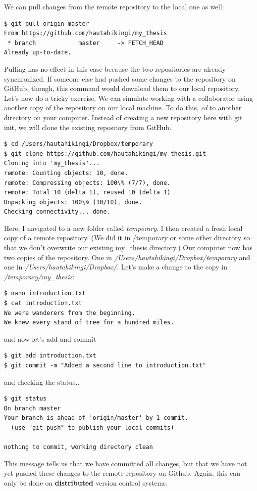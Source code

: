 \documentclass{article}
\begin{document}
We can pull changes from the remote repository to the local one as well:

\begin{lstlisting}[frame=single]
$ git pull origin master
From https://github.com/hautahikingi/my_thesis
 * branch            master     -> FETCH_HEAD
Already up-to-date.
\end{lstlisting}
Pulling has no effect in this case because the two repositories are already synchronized. If someone else had pushed some changes to the repository on GitHub, though, this command would download them to our local repository.\\

Let's now do a tricky exercise. We can simulate working with a collaborator using another copy of the repository on our local machine. To do this, \emph{cd} to another directory on your computer. Instead of creating a new repository here with git init, we will clone the existing repository from GitHub.\\

\begin{lstlisting}
$ cd /Users/hautahikingi/Dropbox/temporary
$ git clone https://github.com/hautahikingi/my_thesis.git
Cloning into 'my_thesis'...
remote: Counting objects: 10, done.
remote: Compressing objects: 100\% (7/7), done.
remote: Total 10 (delta 1), reused 10 (delta 1)
Unpacking objects: 100\% (10/10), done.
Checking connectivity... done.
\end{lstlisting}
Here, I navigated to a new folder called \emph{temporary}. I then created a fresh local copy of a remote repository. (We did it in /temporary or some other directory so that we don't overwrite our existing my\_thesis directory.) Our computer now has two copies of the repository. One in \emph{/Users/hautahikingi/Dropbox/temporary} and one in \emph{/Users/hautahikingi/Dropbox/}. Let's make a change to the copy in \emph{/temporary/my\_thesis}:
\begin{lstlisting}
$ nano introduction.txt
$ cat introduction.txt
We were wanderers from the beginning.
We knew every stand of tree for a hundred miles.
\end{lstlisting}
and now let's add and commit
\begin{lstlisting}
$ git add introduction.txt
$ git commit -m "Added a second line to introduction.txt"
\end{lstlisting}
and checking the status..
\begin{lstlisting}
$ git status
On branch master
Your branch is ahead of 'origin/master' by 1 commit.
  (use "git push" to publish your local commits)

nothing to commit, working directory clean
\end{lstlisting}
This message tells us that we have committed all changes, but that we have not yet pushed these changes to the remote repository on Github. Again, this can only be done on \textbf{distributed} version control systems.\\
\end{document}
